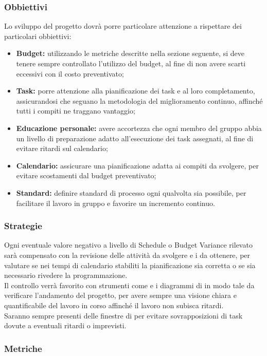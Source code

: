 \documentclass[PianoDiQualifica.tex]{subfiles}
\begin{document}
\subsubsection{Obbiettivi}
Lo sviluppo del progetto dovrà porre particolare attenzione a rispettare dei particolari obbiettivi:
\begin{itemize}
	\item \textbf{Budget:} utilizzando le metriche descritte nella sezione seguente, si deve tenere sempre controllato l'utilizzo del budget, al fine di non avere scarti eccessivi con il costo preventivato;
	\item \textbf{Task:} porre attenzione alla pianificazione dei task e al loro completamento, assicurandosi che seguano la metodologia del miglioramento continuo, affinché tutti i compiti ne traggano vantaggio;
	\item \textbf{Educazione personale:} avere accortezza che ogni membro del gruppo abbia un livello di preparazione adatto all'esecuzione dei task assegnati, al fine di evitare ritardi sul calendario;
	\item \textbf{Calendario:} assicurare una pianificazione adatta ai compiti da svolgere, per evitare scostamenti dal budget preventivato;
	\item \textbf{Standard:} definire standard di processo ogni qualvolta sia possibile, per facilitare il lavoro in gruppo e favorire un incremento continuo.
\end{itemize}

\subsubsection{Strategie}
Ogni eventuale valore negativo a livello di Schedule o Budget Variance rilevato sarà compensato con la revisione delle attività da svolgere e i  da ottenere, per valutare se nei tempi di calendario stabiliti la pianificazione sia corretta o se sia necessario rivedere la programmazione.\\
Il controllo verrà favorito con strumenti come  e i diagrammi di  in modo tale da verificare l'andamento del progetto, per avere sempre una visione chiara e quantificabile del lavoro in corso affinché il lavoro non subisca ritardi.\\
Saranno sempre presenti delle finestre di  per evitare sovrapposizioni di task dovute a eventuali ritardi o imprevisti. 

\subsubsection{Metriche} 
\end{document}
